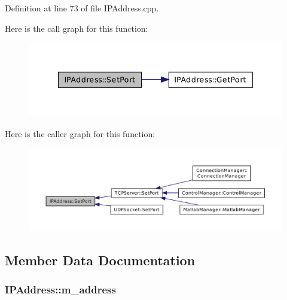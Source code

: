 Definition at line 73 of file I\-P\-Address.\-cpp.



Here is the call graph for this function\-:\nopagebreak
\begin{figure}[H]
\begin{center}
\leavevmode
\includegraphics[width=342pt]{class_i_p_address_a5908d6242879f0e45685f8b0734dafa7_cgraph}
\end{center}
\end{figure}




Here is the caller graph for this function\-:\nopagebreak
\begin{figure}[H]
\begin{center}
\leavevmode
\includegraphics[width=350pt]{class_i_p_address_a5908d6242879f0e45685f8b0734dafa7_icgraph}
\end{center}
\end{figure}




\subsection{Member Data Documentation}
\hypertarget{class_i_p_address_aaafe20f26b2569a5ac9cd3b61b5c0c50}{
\subsubsection[{m\-\_\-address}]{ I\-P\-Address\-::m\-\_\-address\hspace{0.3cm}{\ttfamily [private]}}}\label{class_i_p_address_aaafe20f26b2569a5ac9cd3b61b5c0c50}


